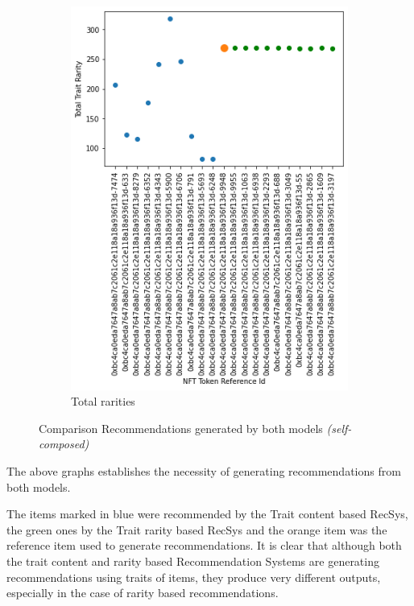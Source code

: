 \begin{figure}[h!]
\begin{subfigure}[b]{0.45\textwidth}
         \includegraphics[width=\textwidth]{images/Testing/trait/Total rarities content + rarity based.png}
         \caption{Total rarities}
         \label{fig:1-2}
     \end{subfigure}
     \hfill
        \caption{Comparison Recommendations generated by both models \textit{(self-composed)}}
        \label{fig:1}
\end{figure}

The above graphs establishes the necessity of generating recommendations from both models.

The items marked in blue were recommended by the Trait content based RecSys, the green ones by the Trait rarity based RecSys and the orange item was the reference item used to generate recommendations.
It is clear that although both the trait content and rarity based Recommendation Systems are generating recommendations using traits of items, they produce very different outputs, especially in the case of rarity based recommendations.


